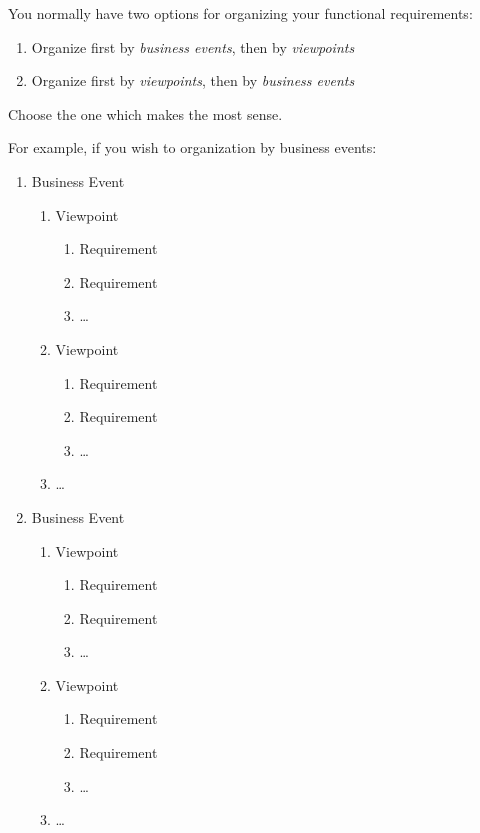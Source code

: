 \documentclass[]{article}
\begin{document}
You normally have two options for organizing your functional requirements:
\begin{enumerate}
	\item Organize first by \emph{business events}, then by \emph{viewpoints}
	\item Organize first by \emph{viewpoints}, then by \emph{business events}
\end{enumerate}
Choose the one which makes the most sense.

For example, if you wish to organization by business events:
\begin{enumerate}[{BE}1.]
	\item Business Event
	\begin{enumerate}[{VP1}.1]
		\item Viewpoint
			\begin{enumerate}
				\item Requirement
				\item Requirement
				\item \dots
			\end{enumerate}
		\item Viewpoint
			\begin{enumerate}
				\item Requirement
				\item Requirement
				\item \dots
			\end{enumerate}
		\item \dots
	\end{enumerate}
	\item Business Event
	\begin{enumerate}[{VP2}.1]
		\item Viewpoint
			\begin{enumerate}
				\item Requirement
				\item Requirement
				\item \dots
			\end{enumerate}
		\item Viewpoint
			\begin{enumerate}
				\item Requirement
				\item Requirement
				\item \dots
			\end{enumerate}
		\item \dots
	\end{enumerate}
\end{enumerate}
\end{document}
